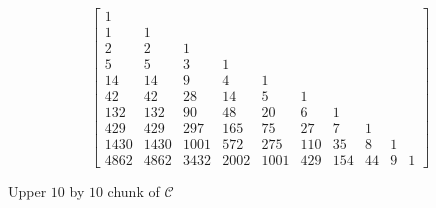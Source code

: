 
\begin{table}
    \begin{displaymath} 
        \left[\begin{array}{rrrrrrrrrr}
        1 &  &  &  &  &  &  &  &  &  \\
        1 & 1 &  &  &  &  &  &  &  &  \\
        2 & 2 & 1 &  &  &  &  &  &  &  \\
        5 & 5 & 3 & 1 &  &  &  &  &  &  \\
        14 & 14 & 9 & 4 & 1 &  &  &  &  &  \\
        42 & 42 & 28 & 14 & 5 & 1 &  &  &  &  \\
        132 & 132 & 90 & 48 & 20 & 6 & 1 &  &  &  \\
        429 & 429 & 297 & 165 & 75 & 27 & 7 & 1 &  &  \\
        1430 & 1430 & 1001 & 572 & 275 & 110 & 35 & 8 & 1 &  \\
        4862 & 4862 & 3432 & 2002 & 1001 & 429 & 154 & 44 & 9 & 1
        \end{array}\right]
        \iffalse
        \quad
        \mathcal{C}_{10}^{-1}\left(\begin{array}{rrrrrrrrrr}
        1 &  &  &  &  &  &  &  &  &  \\
        1 &  &  &  &  &  &  &  &  &  \\
         & 1 &  &  &  &  &  &  &  &  \\
         & -1 & 1 &  &  &  &  &  &  &  \\
         &  & -2 & 1 &  &  &  &  &  &  \\
         &  & 1 & -3 & 1 &  &  &  &  &  \\
         &  &  & 3 & -4 & 1 &  &  &  &  \\
         &  &  & -1 & 6 & -5 & 1 &  &  &  \\
         &  &  &  & -4 & 10 & -6 & 1 &  &  \\
         &  &  &  & 1 & -10 & 15 & -7 & 1 & 
        \end{array}\right)
        \fi
    \end{displaymath}

  \caption[$\mathcal{C}$ and $\mathcal{C}^{-1}$]{Upper $10$ by $10$ chunk of $\mathcal{C}$}

  \label{tab:catalan:array} 

\end{table}
